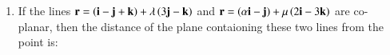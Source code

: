 \documentclass[journal,12pt,onecolumn]{IEEEtran}
\theoremstyle{remark}
\begin{document}
\begin{enumerate}
\item If the lines $\mathbf{r}=\left(\mathbf{i}-\mathbf{j}+\mathbf{k}\right)+\lambda\left(3\mathbf{j}-\mathbf{k}\right)$ and $\mathbf{r}=\left(\alpha\mathbf{i}-\mathbf{j}\right)+\mu\left(2\mathbf{i}-3\mathbf{k}\right)$ are co-planar, then the distance of the plane contaioning these two lines from the point  is:

\hfill{}
\begin{enumerate}
\end{enumerate}

\end{enumerate}
\end{document}
